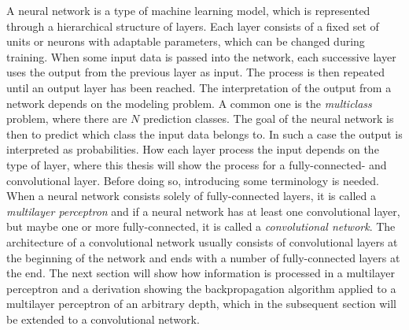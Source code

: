 \label{NN}
A neural  network is a type of machine learning model, which is represented
through a hierarchical structure of layers. Each layer consists of a fixed set
of units or neurons with adaptable parameters, which can be changed during
training. When some input data is passed into the network, each successive layer
uses the output from the previous layer as input. The process is then repeated
until an output layer has been reached. The interpretation of the output from a
network depends on the modeling problem. A common one is the \emph{multiclass}
problem, where there are $N$ prediction classes. The goal of the neural network
is then to predict which class the input data belongs to. In such a case the
output is interpreted as probabilities.\newline \newline 
How each layer process the input depends on the type of layer, where this thesis
will show the process for a fully-connected- and convolutional layer. Before
doing so, introducing some terminology is needed. When a neural network consists
solely of fully-connected layers, it is called a \emph{multilayer perceptron}
and if a neural network has at least one convolutional layer, but maybe one or
more fully-connected, it is called a \emph{convolutional network}. The
architecture of a convolutional network usually consists of convolutional layers
at the beginning of the network and ends with a number of fully-connected layers
at the end. The next section will show how information is processed in a
multilayer perceptron and a derivation showing the backpropagation algorithm
applied to a multilayer perceptron of an arbitrary depth, which in the
subsequent section will be extended to a convolutional network. 

\newpage 

